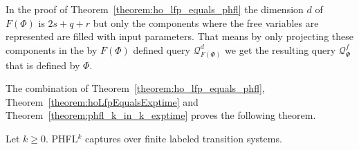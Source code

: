 \begin{remark}
In the proof of Theorem~\ref{theorem:ho_lfp_equals_phfl} the dimension $d$ of $F(\Phi)$ is $2s+q+r$ but only the components where the free variables are represented are filled with input parameters. That means by only projecting these components in the by $F(\Phi)$ defined query $\mathcal{Q}^d_{F(\Phi)}$ we get the resulting query $\mathcal{Q}^f_{\Phi}$ that is defined by $\Phi$. 
\end{remark}

The combination of Theorem~\ref{theorem:ho_lfp_equals_phfl}, Theorem~\ref{theorem:hoLfpEqualsExptime} and
Theorem~\ref{theorem:phfl_k_in_k_exptime} proves the following theorem.

\begin{theorem}
    Let $k \geq 0$. PHFL$^k$ captures  over finite labeled transition systems.
\end{theorem}

